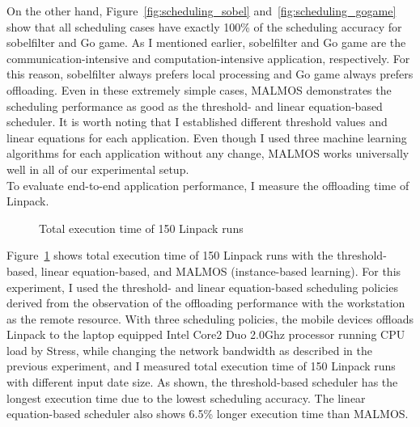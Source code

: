 {{%
On the other hand, Figure~\ref{fig:scheduling_sobel}
and~\ref{fig:scheduling_gogame} show that all scheduling
cases have exactly 100\% of the scheduling accuracy for sobelfilter and Go game.
%
As I mentioned earlier, sobelfilter and Go game are the
communication-intensive and computation-intensive application,
respectively.
%
For this reason, sobelfilter always prefers local processing and Go game
always prefers offloading.
%
Even in these extremely simple cases, MALMOS demonstrates the scheduling
performance as good as the threshold- and linear equation-based
scheduler.
%
It is worth noting that I established different threshold values and linear
equations for each application. 
%
Even though I used three machine learning algorithms for each
application without any change, MALMOS works universally well in all of
our experimental setup.\\
%
To evaluate end-to-end application performance, I measure the
offloading time of Linpack.
%
\begin{figure}
\centering
{}
\caption{Total execution time of 150 Linpack runs}
\label{fig:execution}
\end{figure}
%
Figure~\ref{fig:execution} shows total execution time of 150 Linpack runs with
the threshold-based, linear equation-based, and MALMOS (instance-based
learning).
%
For this experiment, I used the threshold- and linear equation-based
scheduling policies derived from the observation of the offloading
performance with the workstation as the remote resource.
%
With three scheduling policies, the mobile devices offloads Linpack to
the laptop equipped Intel Core2 Duo 2.0Ghz processor running CPU load by
Stress, while changing the network bandwidth as described in the previous 
experiment, and I measured total execution time of 150 Linpack runs with 
different input date size. 
%
As shown, the threshold-based scheduler has the longest execution
time due to the lowest scheduling accuracy.
%
The linear equation-based scheduler also shows 6.5\% longer execution
time than MALMOS. 
%

}}
